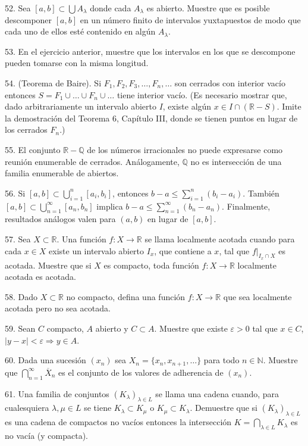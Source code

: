 \documentclass[12pt,oneside]{book}
\begin{document}
52. Sea \([a, b] \subset \bigcup A_\lambda\) donde cada \(A_\lambda\) es abierto. Muestre que es posible descomponer \([a, b]\) en un número finito de intervalos yuxtapuestos de modo que cada uno de ellos esté contenido en algún \(A_\lambda\).

53. En el ejercicio anterior, muestre que los intervalos en los que se descompone pueden tomarse con la misma longitud.

54. (Teorema de Baire). Si \(F_1, F_2, F_3, \dots, F_n, \dots\) son cerrados con interior vacío entonces \(S = F_1 \cup \dots \cup F_n \cup \dots\) tiene interior vacío. (Es necesario mostrar que, dado arbitrariamente un intervalo abierto \(I\), existe algún \(x \in I \cap (\mathbb{R} - S)\). Imite la demostración del Teorema 6, Capítulo III, donde se tienen puntos en lugar de los cerrados \(F_n\).)

55. El conjunto \(\mathbb{R} - \mathbb{Q}\) de los números irracionales no puede expresarse como reunión enumerable de cerrados. Análogamente, \(\mathbb{Q}\) no es intersección de una familia enumerable de abiertos.

56. Si \([a, b] \subset \bigcup_{i=1}^n [a_i, b_i]\), entonces \(b - a \leq \sum_{i=1}^n (b_i - a_i)\). También \([a, b] \subset \bigcup_{n=1}^\infty [a_n, b_n]\) implica \(b - a \leq \sum_{n=1}^\infty (b_n - a_n)\). Finalmente, resultados análogos valen para \((a, b)\) en lugar de \([a, b]\).

57. Sea \(X \subset \mathbb{R}\). Una función \(f: X \to \mathbb{R}\) se llama localmente acotada cuando para cada \(x \in X\) existe un intervalo abierto \(I_x\), que contiene a \(x\), tal que \(f|_{I_x \cap X}\) es acotada. Muestre que si \(X\) es compacto, toda función \(f: X \to \mathbb{R}\) localmente acotada es acotada.

58. Dado \(X \subset \mathbb{R}\) no compacto, defina una función \(f: X \to \mathbb{R}\) que sea localmente acotada pero no sea acotada.

59. Sean \(C\) compacto, \(A\) abierto y \(C \subset A\). Muestre que existe \(\varepsilon > 0\) tal que \(x \in C\), \(|y - x| < \varepsilon \Rightarrow y \in A\).

60. Dada una sucesión \((x_n)\) sea \(X_n = \{x_n, x_{n+1}, \dots\}\) para todo \(n \in \mathbb{N}\). Muestre que \(\bigcap_{n=1}^\infty \overline{X}_n\) es el conjunto de los valores de adherencia de \((x_n)\).

61. Una familia de conjuntos \((K_\lambda)_{\lambda \in L}\) se llama una cadena cuando, para cualesquiera \(\lambda, \mu \in L\) se tiene \(K_\lambda \subset K_\mu\) o \(K_\mu \subset K_\lambda\). Demuestre que si \((K_\lambda)_{\lambda \in L}\) es una cadena de compactos no vacíos entonces la intersección \(K = \bigcap_{\lambda \in L} K_\lambda\) es no vacía (y compacta).
\end{document}
